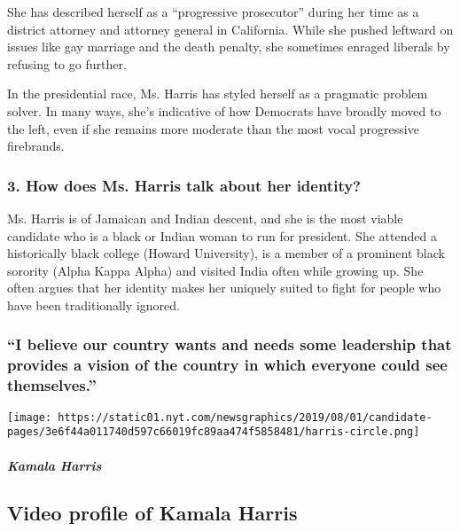 She has described herself as a ``progressive prosecutor'' during her
time as a district attorney and attorney general in California. While
she pushed leftward on issues like gay marriage and the death penalty,
she sometimes enraged liberals by refusing to go further.

In the presidential race, Ms. Harris has styled herself as a pragmatic
problem solver. In many ways, she's indicative of how Democrats have
broadly moved to the left, even if she remains more moderate than the
most vocal progressive firebrands.

\hypertarget{3-how-does-ms-harris-talk-about-her-identity}{%
\subsubsection{\texorpdfstring{\textbf{3. How does Ms. Harris talk about
her
identity?}}{3. How does Ms. Harris talk about her identity?}}\label{3-how-does-ms-harris-talk-about-her-identity}}

Ms. Harris is of Jamaican and Indian descent, and she is the most viable
candidate who is a black or Indian woman to run for president. She
attended a historically black college (Howard University), is a member
of a prominent black sorority (Alpha Kappa Alpha) and visited India
often while growing up. She often argues that her identity makes her
uniquely suited to fight for people who have been traditionally ignored.

\hypertarget{i-believe-our-country-wants-and-needs-some-leadership-that-provides-a-vision-of-the-country-in-which-everyone-could-see-themselves}{%
\subsubsection{``I believe our country wants and needs some leadership
that provides a vision of the country in which everyone could see
themselves.''}\label{i-believe-our-country-wants-and-needs-some-leadership-that-provides-a-vision-of-the-country-in-which-everyone-could-see-themselves}}

\texttt{[image: https://static01.nyt.com/newsgraphics/2019/08/01/candidate-pages/3e6f44a011740d597c66019fc89aa474f5858481/harris-circle.png]}

\hypertarget{kamala-harris-1}{%
\subparagraph{Kamala Harris}\label{kamala-harris-1}}

\hypertarget{video-profile-of-kamala-harris}{%
\subsection{Video profile of Kamala
Harris}\label{video-profile-of-kamala-harris}}

